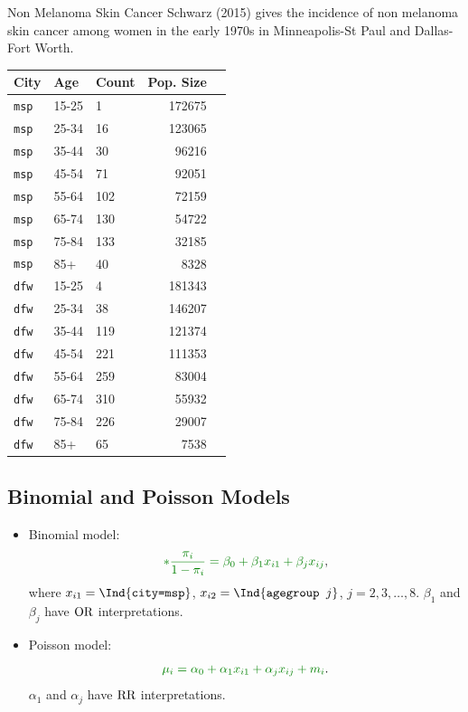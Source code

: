 \documentclass{article}\usepackage[]{graphicx}\usepackage[svgnames]{xcolor}
\let\log\relax%
\newcommand{\OR}{\text{OR}}%
\newcommand{\RR}{\text{RR}}%
\begin{document}
\begin{Example}{Non Melanoma Skin Cancer}
    Schwarz (2015) gives the incidence of non melanoma skin cancer among women in the early
    1970s in Minneapolis-St Paul and Dallas-Fort Worth.
    \begin{center}
        \begin{tabular}{lllrr}
            \toprule
            City         & Age   & Count & Pop. Size \\
            \midrule
            \texttt{msp} & 15-25 & 1     & 172675    \\
            \texttt{msp} & 25-34 & 16    & 123065    \\
            \texttt{msp} & 35-44 & 30    & 96216     \\
            \texttt{msp} & 45-54 & 71    & 92051     \\
            \texttt{msp} & 55-64 & 102   & 72159     \\
            \texttt{msp} & 65-74 & 130   & 54722     \\
            \texttt{msp} & 75-84 & 133   & 32185     \\
            \texttt{msp} & 85+   & 40    & 8328      \\
            \texttt{dfw} & 15-25 & 4     & 181343    \\
            \texttt{dfw} & 25-34 & 38    & 146207    \\
            \texttt{dfw} & 35-44 & 119   & 121374    \\
            \texttt{dfw} & 45-54 & 221   & 111353    \\
            \texttt{dfw} & 55-64 & 259   & 83004     \\
            \texttt{dfw} & 65-74 & 310   & 55932     \\
            \texttt{dfw} & 75-84 & 226   & 29007     \\
            \texttt{dfw} & 85+   & 65    & 7538      \\
            \bottomrule
        \end{tabular}
    \end{center}
\end{Example}
\subsection*{Binomial and Poisson Models}
\begin{itemize}
    \item Binomial model:
          \[ \textcolor{Green}{\log*{\frac{\pi_i}{1-\pi_i}}=\beta_0+\beta_1x_{i1}+\beta_jx_{ij}}, \]
          where $ x_{i1}=\Ind{\texttt{city=msp}} $, $ x_{i2}=\Ind{\texttt{agegroup }j} $, $ j=2,3,\ldots,8 $. $ \beta_1 $ and $ \beta_j $
          have $ \log{\OR} $ interpretations.
    \item Poisson model:
          \[ \textcolor{Green}{\log{\mu_i}=\alpha_0+\alpha_1x_{i1}+\alpha_jx_{ij}+\log{m_i}}. \]
          $ \alpha_1 $ and $ \alpha_j $ have $ \log{\RR} $ interpretations.
\end{itemize}
\end{document}
